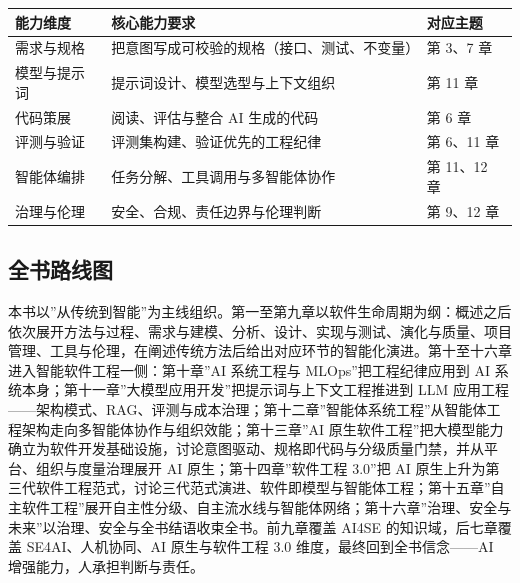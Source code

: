 \documentclass[12pt,a4paper,twoside,openany]{ctexbook}
\numberwithin{figure}{chapter}
\numberwithin{table}{chapter}
\newcounter{none}
\begin{document}
{\def\LTcaptype{none} %
\begin{longtable}[]{@{}
  >{\raggedright\arraybackslash}p{}
  >{\raggedright\arraybackslash}p{}
  >{\raggedright\arraybackslash}p{}@{}}
\toprule\noalign{}
\begin{minipage}[b]{\linewidth}\raggedright
能力维度
\end{minipage} & \begin{minipage}[b]{\linewidth}\raggedright
核心能力要求
\end{minipage} & \begin{minipage}[b]{\linewidth}\raggedright
对应主题
\end{minipage} \\
\midrule\noalign{}
\endhead
\bottomrule\noalign{}
\endlastfoot
需求与规格 & 把意图写成可校验的规格（接口、测试、不变量） & 第 3、7
章 \\
模型与提示词 & 提示词设计、模型选型与上下文组织 & 第 11 章 \\
代码策展 & 阅读、评估与整合 AI 生成的代码 & 第 6 章 \\
评测与验证 & 评测集构建、验证优先的工程纪律 & 第 6、11 章 \\
智能体编排 & 任务分解、工具调用与多智能体协作 & 第 11、12 章 \\
治理与伦理 & 安全、合规、责任边界与伦理判断 & 第 9、12 章 \\
\end{longtable}
}

\subsection{全书路线图}\label{ux5168ux4e66ux8defux7ebfux56fe}

本书以''从传统到智能''为主线组织。第一至第九章以软件生命周期为纲：概述之后依次展开方法与过程、需求与建模、分析、设计、实现与测试、演化与质量、项目管理、工具与伦理，在阐述传统方法后给出对应环节的智能化演进。第十至十六章进入智能软件工程一侧：第十章''AI
系统工程与 MLOps''把工程纪律应用到 AI
系统本身；第十一章''大模型应用开发''把提示词与上下文工程推进到 LLM
应用工程------架构模式、RAG、评测与成本治理；第十二章''智能体系统工程''从智能体工程架构走向多智能体协作与组织效能；第十三章''AI
原生软件工程''把大模型能力确立为软件开发基础设施，讨论意图驱动、规格即代码与分级质量门禁，并从平台、组织与度量治理展开
AI 原生；第十四章''软件工程 3.0''把 AI
原生上升为第三代软件工程范式，讨论三代范式演进、软件即模型与智能体工程；第十五章''自主软件工程''展开自主性分级、自主流水线与智能体网络；第十六章''治理、安全与未来''以治理、安全与全书结语收束全书。前九章覆盖
AI4SE 的知识域，后七章覆盖 SE4AI、人机协同、AI 原生与软件工程 3.0
维度，最终回到全书信念------AI 增强能力，人承担判断与责任。
\end{document}

